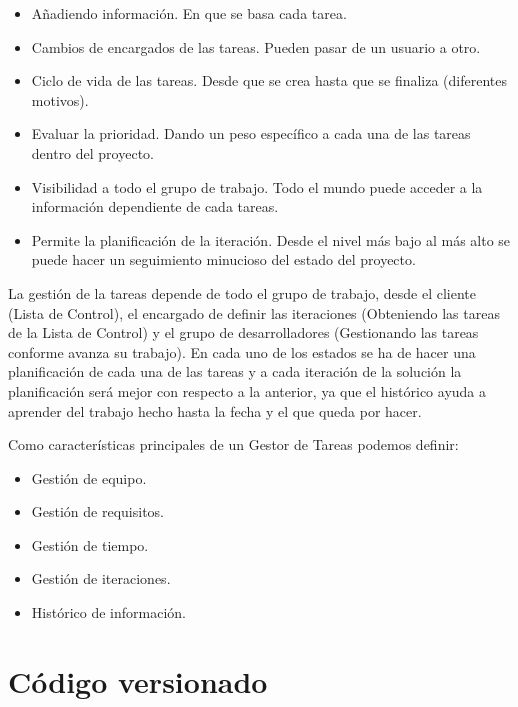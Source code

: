 \begin{itemize}
	\item Añadiendo información. En que se basa cada tarea.
	\item Cambios de encargados de las tareas. Pueden pasar de un usuario a otro.
	\item Ciclo de vida de las tareas. Desde que se crea hasta que se finaliza (diferentes motivos).
	\item Evaluar la prioridad. Dando un peso específico a cada una de las tareas dentro del proyecto.
	\item Visibilidad a todo el grupo de trabajo. Todo el mundo puede acceder a la información dependiente de cada tareas.
	\item Permite la planificación de la iteración. Desde el nivel más bajo al más alto se puede hacer un seguimiento minucioso del estado del proyecto.
\end{itemize}

\par La gestión de la tareas depende de todo el grupo de trabajo, desde el cliente (Lista de Control), el encargado de definir las iteraciones (Obteniendo las tareas de la Lista de Control) y el grupo de desarrolladores (Gestionando las tareas conforme avanza su trabajo). En cada uno de los estados se ha de hacer una planificación de cada una de las tareas y a cada iteración de la solución la planificación será mejor con respecto a la anterior, ya que el histórico ayuda a aprender del trabajo hecho hasta la fecha y el que queda por hacer.

\par Como características principales de un Gestor de Tareas podemos definir:

\begin{itemize}
	\item Gestión de equipo.
	\item Gestión de requisitos.
	\item Gestión de tiempo.
	\item Gestión de iteraciones.
	\item Histórico de información.
\end{itemize}


\section{Código versionado}
\label{sec:codigo-versionado}

